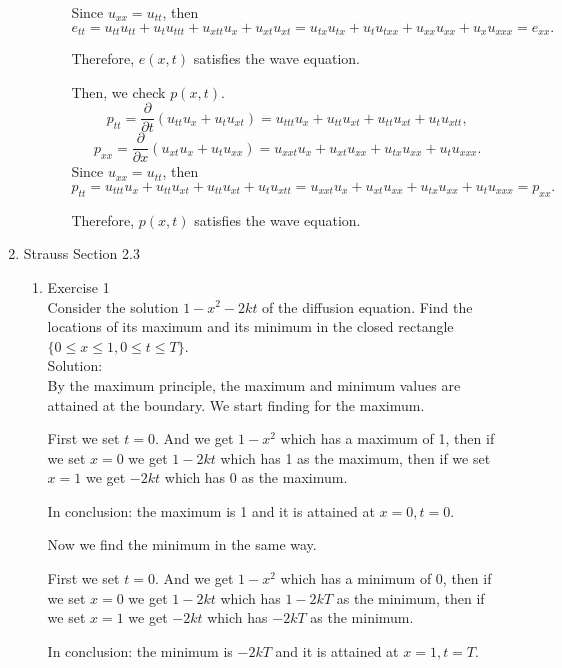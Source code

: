 \documentclass[12pt]{article}%
\begin{document}
\begin{enumerate}
\begin{enumerate}
\begin{enumerate}
            Since $u_{xx}=u_{tt}$, then 
            \[ e_{tt}=u_{tt} u_{tt}+u_{t} u_{ttt}+u_{xtt} u_{x}+u_{xt} u_{xt}=u_{tx} u_{tx}+u_{t} u_{txx}+u_{xx} u_{xx}+u_{x} u_{xxx}=e_{xx}. \]
            
            Therefore, $e(x,t)$ satisfies the wave equation.
            

            Then, we check $p(x,t).$
            \[p_{tt}  =\frac{\partial}{\partial t}\left(u_{tt} u_{x}+u_{t} u_{xt}\right)=u_{ttt} u_{x}+u_{tt} u_{xt}+u_{tt} u_{xt}+u_{t} u_{xtt},\]          
            \[ p_{xx}  =\frac{\partial}{\partial x}\left(u_{xt} u_{x}+u_{t} u_{xx}\right) =u_{xxt} u_{x}+u_{xt} u_{xx}+u_{tx} u_{xx}+u_{t} u_{xxx}. \]
            Since $u_{xx}=u_{tt}$, then 
            \[ p_{tt}=u_{ttt} u_{x}+u_{tt} u_{xt}+u_{tt} u_{xt}+u_{t} u_{xtt}=u_{xxt} u_{x}+u_{xt} u_{xx}+u_{tx} u_{xx}+u_{t} u_{xxx}=p_{xx}. \]
            
            Therefore, $p(x,t)$ satisfies the wave equation.
        \end{enumerate}
    \end{enumerate}
    
    \pagebreak

    \item Strauss Section 2.3 \smallskip
    \begin{enumerate}
        \item Exercise 1 \smallskip \\
        Consider the solution $1 - x^2 -2kt$ of the diffusion equation.  Find the locations of its maximum and its minimum in the closed rectangle $\{0 \leq x \leq 1, 0 \leq t \leq T\}$. \smallskip \\
          Solution:\\
          By the maximum principle, the maximum and minimum values are attained
          at the boundary.
          We start finding for the maximum.

          First we set $t=0$. And we get $1-x^2$ which has a maximum of 1, then
          if we set $x=0$ we get $1-2kt$ which has 1 as the maximum, then
          if we set $x=1$ we get $-2kt$ which has 0 as the maximum.

          In conclusion: the maximum is 1 and it is attained at $x=0,t=0$.
          
          Now we find the minimum in the same way.

          First we set $t=0$. And we get $1-x^2$ which has a minimum of 0, then
          if we set $x=0$ we get $1-2kt$ which has $1-2kT$ as the minimum, then
          if we set $x=1$ we get $-2kt$ which has $-2kT$ as the minimum.

          In conclusion: the minimum is $-2kT$ and it is attained at $x=1,t=T$.
    \end{enumerate}
\end{enumerate}
\end{document}

